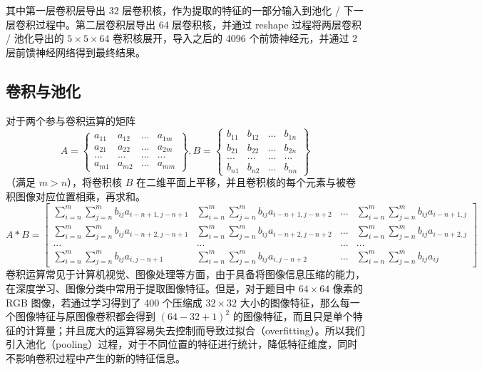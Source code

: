\documentclass[UTF8]{ctexart}
\begin{document}
其中第一层卷积层导出 32 层卷积核，作为提取的特征的一部分输入到池化 / 下一层卷积过程中。第二层卷积层导出 64 层卷积核，并通过 reshape 过程将两层卷积 / 池化导出的 $5 \times 5 \times 64$ 卷积核展开，导入之后的 4096 个前馈神经元，并通过 2 层前馈神经网络得到最终结果。

\subsection{卷积与池化}
对于两个参与卷积运算的矩阵
$$
A = 
\left\{
\begin{matrix}
a_{11} & a_{12} & ... & a_{1m} \\
a_{21} & a_{22} & ... & a_{2m} \\
... & ... & ... & ... \\
a_{m1} & a_{m2} & ... & a_{mm}
\end{matrix}
\right\}
, B = 
\left\{
\begin{matrix}
b_{11} & b_{12} & ... & b_{1n} \\
b_{21} & b_{22} & ... & b_{2n} \\
... & ... & ... & ... \\
b_{n1} & b_{n2} & ... & b_{nn}
\end{matrix}
\right\}
$$
（满足 $m > n$），将卷积核 $B$ 在二维平面上平移，并且卷积核的每个元素与被卷积图像对应位置相乘，再求和。
$$
A * B = 
\left[
\begin{matrix}
\sum_{i = n}^{m}\sum_{j = n}^{m}b_{ij}a_{i-n+1, j-n+1} & \sum_{i = n}^{m}\sum_{j = n}^{m}b_{ij}a_{i-n+1, j-n+2} & ... & \sum_{i = n}^{m}\sum_{j = n}^{m}b_{ij}a_{i-n+1, j} \\
\sum_{i = n}^{m}\sum_{j = n}^{m}b_{ij}a_{i-n+2, j-n+1} & \sum_{i = n}^{m}\sum_{j = n}^{m}b_{ij}a_{i-n+2, j-n+2} & ... & \sum_{i = n}^{m}\sum_{j = n}^{m}b_{ij}a_{i-n+2, j} \\
... & ... & ... & ... \\
\sum_{i = n}^{m}\sum_{j = n}^{m}b_{ij}a_{i, j-n+1} & \sum_{i = n}^{m}\sum_{j = n}^{m}b_{ij}a_{i, j-n+2} & ... & \sum_{i = n}^{m}\sum_{j = n}^{m}b_{ij}a_{ij}
\end{matrix}
\right]
$$
卷积运算常见于计算机视觉、图像处理等方面，由于具备将图像信息压缩的能力，在深度学习、图像分类中常用于提取图像特征。但是，对于题目中 $64 \times 64$ 像素的 RGB 图像，若通过学习得到了 400 个压缩成 $32 \times 32$ 大小的图像特征，那么每一个图像特征与原图像卷积都会得到 $(64 - 32 + 1)^2$ 的图像特征，而且只是单个特征的计算量；并且庞大的运算容易失去控制而导致过拟合（overfitting）。所以我们引入池化（pooling）过程，对于不同位置的特征进行统计，降低特征维度，同时不影响卷积过程中产生的新的特征信息。
\end{document}
